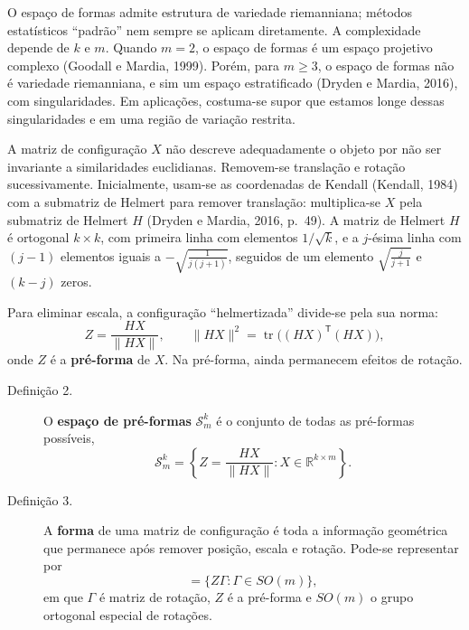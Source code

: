 \documentclass[11pt,a4paper]{article}
\begin{document}
O espaço de formas admite estrutura de variedade riemanniana; métodos estatísticos ``padrão'' nem sempre se aplicam diretamente. A complexidade depende de $k$ e $m$. Quando $m=2$, o espaço de formas é um espaço projetivo complexo (Goodall e Mardia, 1999). Porém, para $m \geq 3$, o espaço de formas não é variedade riemanniana, e sim um espaço estratificado (Dryden e Mardia, 2016), com singularidades. Em aplicações, costuma-se supor que estamos longe dessas singularidades e em uma região de variação restrita.

A matriz de configuração $X$ não descreve adequadamente o objeto por não ser invariante a similaridades euclidianas. Removem-se translação e rotação sucessivamente. Inicialmente, usam-se as coordenadas de Kendall (Kendall, 1984) com a submatriz de Helmert para remover translação: multiplica-se $X$ pela submatriz de Helmert $H$ (Dryden e Mardia, 2016, p.\ 49). A matriz de Helmert $H$ é ortogonal $k \times k$, com primeira linha com elementos $1/\sqrt{k}$, e a $j$-ésima linha com $(j-1)$ elementos iguais a $-\sqrt{\frac{1}{j(j+1)}}$, seguidos de um elemento $\sqrt{\frac{j}{j+1}}$ e $(k-j)$ zeros.

Para eliminar escala, a configuração ``helmertizada'' divide-se pela sua norma:
\begin{equation}
  Z = \frac{HX}{\lVert HX \rVert}, \qquad
  \lVert HX \rVert^2 = \operatorname{tr}\bigl((HX)^{\mathsf T}(HX)\bigr),
\end{equation}
onde $Z$ é a \textbf{pré-forma} de $X$. Na pré-forma, ainda permanecem efeitos de rotação.

\begin{description}
  \item[Definição 2.] O \textbf{espaço de pré-formas} $\mathcal{S}_m^k$ é o conjunto de todas as pré-formas possíveis,
  \[
    \mathcal{S}_m^k = \left\{ Z = \frac{HX}{\lVert HX \rVert} : X \in \mathbb{R}^{k \times m} \right\}.
  \]
\end{description}

\begin{description}
  \item[Definição 3.] A \textbf{forma} de uma matriz de configuração é toda a informação geométrica que permanece após remover posição, escala e rotação. Pode-se representar por
  \begin{equation}
    [Z] = \{ Z\Gamma : \Gamma \in SO(m) \},
  \end{equation}
  em que $\Gamma$ é matriz de rotação, $Z$ é a pré-forma e $SO(m)$ o grupo ortogonal especial de rotações.
\end{description}
\end{document}

